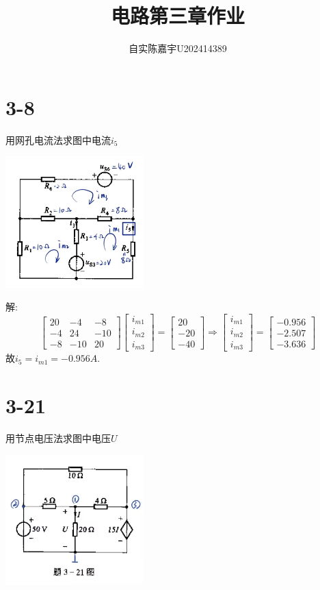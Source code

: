 \documentclass{article}
\title{电路第三章作业}
\author{自实陈嘉宇U202414389}
\date{}
\begin{document}
\maketitle
\section*{3-8}
用网孔电流法求图中电流$i_5$
\begin{center}
\includegraphics[width=0.4\textwidth,height=0.2\textheight]{3-8.jpg}
\end{center}

解:
\[
\begin{bmatrix}
    20&-4&-8\\
    -4&24&-10\\
    -8&-10&20
\end{bmatrix}
\begin{bmatrix}
    i_{m1}\\
    i_{m2}\\
    i_{m3}
\end{bmatrix}
=\begin{bmatrix}
    20\\
    -20\\
    -40
\end{bmatrix}
\Rightarrow
\begin{bmatrix}
    i_{m1}\\
    i_{m2}\\
    i_{m3}
\end{bmatrix}
=\begin{bmatrix}
    -0.956\\
    -2.507\\
    -3.636
\end{bmatrix}
\]
故$i_5=i_{m1}=-0.956A$.
\section*{3-21}
用节点电压法求图中电压$U$
\begin{center}
\includegraphics[width=0.4\textwidth,height=0.2\textheight]{3-21.jpg}
\end{center}
\end{document}

